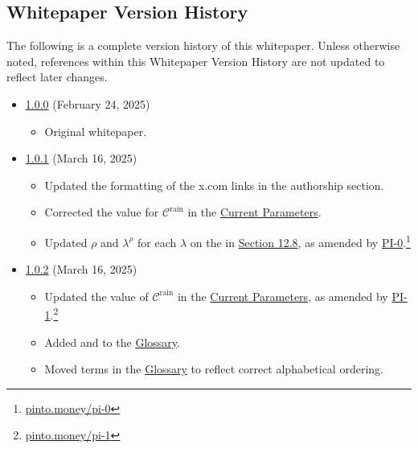 \documentclass[class=article, crop=false]{standalone}
\begin{document}

\subsection{Whitepaper Version History}

The following is a complete version history of this whitepaper. Unless otherwise noted, references within this Whitepaper Version History are not updated to reflect later changes.

\begin{itemize}[topsep=0pt, itemsep=3pt,leftmargin=16pt]
    \item \href{https://github.com/pinto-org/whitepaper/blob/master/version-history/pinto1_0_0.pdf}{1.0.0} (February 24, 2025)
    
    \begin{itemize}
        \item Original whitepaper.
    \end{itemize}
    
    \item \href{https://github.com/pinto-org/whitepaper/blob/master/version-history/pinto1_0_1.pdf}{1.0.1} (March 16, 2025)
    
    \begin{itemize}
        \item Updated the formatting of the x.com links in the authorship section.
        \item Corrected the value for $\mathscr{C}^{\text{rain}}$ in the \hyperlink{subsection.12.1}{Current Parameters}.
        \item Updated $\rho$ and $\lambda^{\rho}$ for each $\lambda$ on the  in \hyperlink{subsection.12.8}{Section 12.8}, as amended by \href{https://pinto.money/pi-0}{PI-0}.\footnote{\href{https://pinto.money/pi-0}{pinto.money/pi-0}}
    \end{itemize}

    \item \href{https://github.com/pinto-org/whitepaper/blob/master/version-history/pinto1_0_2.pdf}{1.0.2} (March 16, 2025)
    
    \begin{itemize}
        \item Updated the value of $\mathscr{C}^{\text{rain}}$ in the \hyperlink{subsection.12.1}{Current Parameters}, as amended by \href{https://pinto.money/pi-1}{PI-1}.\footnote{\href{https://pinto.money/pi-1}{pinto.money/pi-1}}
        \item Added  and  to the \hyperlink{subsection.12.14}{Glossary}.
        \item Moved terms in the \hyperlink{subsection.12.14}{Glossary} to reflect correct alphabetical ordering.
    \end{itemize}


\end{itemize}
\end{document}
